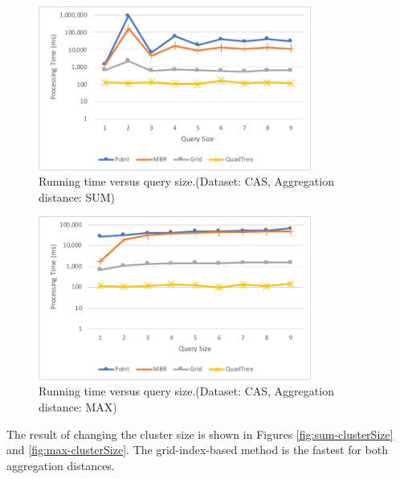 \documentclass[a4paper,11pt]{report}
\theoremstyle{mytheoremstyle}
\begin{document}
\begin{figure}
    \begin{center}
        \includegraphics[width=0.8\textwidth]{src/images/CAS-SUM-Q.pdf}
    \end{center}
    \caption{Running time versus query size.(Dataset: CAS, Aggregation distance: SUM)}
    \label{fig:sum-querySize-CAS}
\end{figure}

\begin{figure}
    \begin{center}
        \includegraphics[width=0.8\textwidth]{src/images/CAS-MAX-Q.pdf}
    \end{center}
    \caption{Running time versus query size.(Dataset: CAS, Aggregation distance: MAX)}
    \label{fig:max-querySize-CAS}
\end{figure}

The result of changing the cluster size is shown in Figures \ref{fig:sum-clusterSize} and \ref{fig:max-clusterSize}. The grid-index-based method is the fastest for both aggregation distances.
\end{document}
